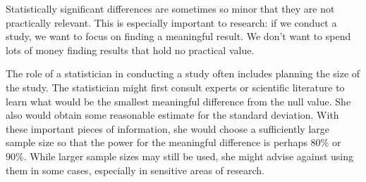 Statistically significant differences are sometimes so minor that they are not practically relevant. This is especially important to research: if we conduct a study, we want to focus on finding a meaningful result. We don't want to spend lots of money finding results that hold no practical value.

The role of a statistician in conducting a study often includes planning the size of the study. The statistician might first consult experts or scientific literature to learn what would be the smallest meaningful difference from the null value. She also would obtain some reasonable estimate for the standard deviation. With these important pieces of information, she would choose a sufficiently large sample size so that the power for the meaningful difference is perhaps 80\% or 90\%. While larger sample sizes may still be used, she might advise against using them in some cases, especially in sensitive areas of research.



